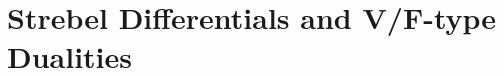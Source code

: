 \documentclass[english]{article}
\DeclareMathOperator{\Tr}{Tr}
\begin{document}
%         






\section{Strebel Differentials and V/F-type Dualities}
\end{document}
